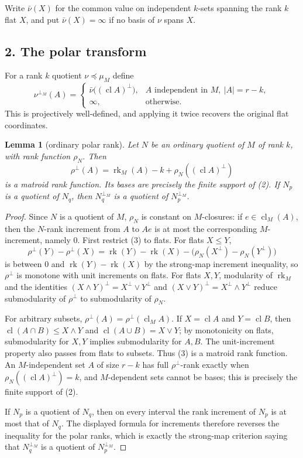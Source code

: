 \documentclass[12pt]{article}
\newcommand{\rk}{\operatorname{rk}}
\newcommand{\cl}{\operatorname{cl}}
\newtheorem{lemma}{Lemma}
\begin{document}
Write $\bar\nu(X)$ for the common value on independent $k$-sets spanning
the rank $k$ flat $X$, and put $\bar\nu(X)=\infty$ if no basis of $\nu$
spans $X$.

\subsection*{2. The polar transform}

For a rank $k$ quotient $\nu\preceq\mu_M$ define
\[
 \nu^{\perp_M}(A)=
 \begin{cases}
   \bar\nu\bigl((\cl A)^\perp\bigr),
      & A\text{ independent in }M,\ |A|=r-k,\\
   \infty,&\text{otherwise.}
 \end{cases}                                                 \tag{2}
\]
This is projectively well-defined, and applying it twice recovers the
original flat coordinates.

\begin{lemma}[ordinary polar rank]\label{lem:ordinary}
Let $N$ be an ordinary quotient of $M$ of rank $k$, with rank function
$\rho_N$.  Then
\[
        \rho^\perp(A)=\rk_M(A)-k+\rho_N((\cl A)^\perp)          \tag{3}
\]
is a matroid rank function.  Its bases are precisely the finite support
of (2).  If $N_p$ is a quotient of $N_q$, then
$N_q^{\perp_M}$ is a quotient of $N_p^{\perp_M}$.
\end{lemma}

\begin{proof}
Since $N$ is a quotient of $M$, $\rho_N$ is constant on $M$-closures:
if $e\in\cl_M(A)$, then the $N$-rank increment from $A$ to $Ae$ is at
most the corresponding $M$-increment, namely $0$.  First restrict (3) to
flats.  For flats $X\le Y$,
\[
\rho^\perp(Y)-\rho^\perp(X)
 =\rk(Y)-\rk(X)-\bigl(\rho_N(X^\perp)-\rho_N(Y^\perp)\bigr)
\]
is between $0$ and $\rk(Y)-\rk(X)$ by the strong-map increment
inequality, so $\rho^\perp$ is monotone with unit increments on flats.
For flats $X,Y$, modularity of $\rk_M$ and the identities
$(X\wedge Y)^\perp=X^\perp\vee Y^\perp$ and
$(X\vee Y)^\perp=X^\perp\wedge Y^\perp$ reduce submodularity of
$\rho^\perp$ to submodularity of $\rho_N$.

For arbitrary subsets, $\rho^\perp(A)=\rho^\perp(\cl_M A)$.  If
$X=\cl A$ and $Y=\cl B$, then
$\cl(A\cap B)\le X\wedge Y$ and $\cl(A\cup B)=X\vee Y$; by monotonicity
on flats, submodularity for $X,Y$ implies submodularity for $A,B$.
The unit-increment property also passes from flats to subsets.  Thus
(3) is a matroid rank function.  An $M$-independent set $A$ of size
$r-k$ has full $\rho^\perp$-rank exactly when
$\rho_N((\cl A)^\perp)=k$, and $M$-dependent sets cannot be bases; this
is precisely the finite support of (2).

If $N_p$ is a quotient of $N_q$, then on every interval the rank
increment of $N_p$ is at most that of $N_q$.  The displayed formula for
increments therefore reverses the inequality for the polar ranks, which
is exactly the strong-map criterion saying that $N_q^{\perp_M}$ is a
quotient of $N_p^{\perp_M}$.
\end{proof}
\end{document}
